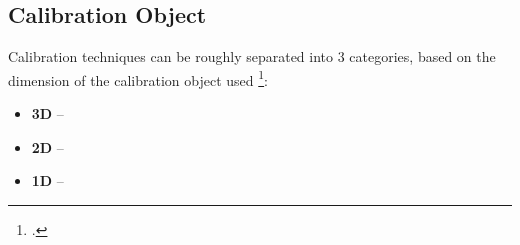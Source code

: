\subsection{Calibration Object}

Calibration techniques can be roughly separated into 3 categories, based on the dimension of the calibration object used \footcite{zhangCameraCalibration2007}:

\begin{itemize}[leftmargin=!, itemindent=-4ex]
    \item \textbf{3D} -- 
    \item \textbf{2D} -- 
    \item \textbf{1D} -- 
\end{itemize}
